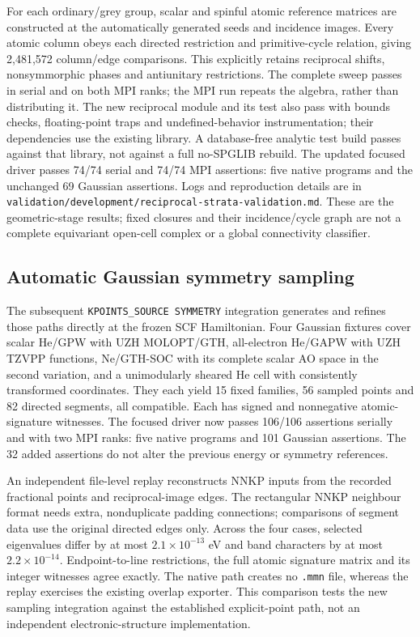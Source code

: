 \documentclass[11pt]{article}
\begin{document}
For each ordinary/grey group, scalar and spinful atomic reference
matrices are constructed at the automatically generated seeds and
incidence images. Every atomic column obeys each directed restriction
and primitive-cycle relation, giving 2,481,572 column/edge comparisons.
This explicitly retains reciprocal shifts, nonsymmorphic phases and
antiunitary restrictions. The complete sweep passes in serial and
on both MPI ranks; the MPI run repeats the algebra, rather than
distributing it. The new reciprocal module and its test also pass
with bounds checks, floating-point traps and undefined-behavior
instrumentation; their dependencies use the existing library. A
database-free analytic test build passes against that library, not
against a full no-SPGLIB rebuild. The updated focused driver passes
74/74 serial and 74/74 MPI assertions: five native programs and the
unchanged 69 Gaussian assertions. Logs and reproduction details are
in \texttt{validation/development/reciprocal-strata-validation.md}.
These are the geometric-stage results; fixed closures and their
incidence/cycle graph are not a complete equivariant open-cell complex
or a global connectivity classifier.

\subsection{Automatic Gaussian symmetry sampling}
The subsequent \texttt{KPOINTS\_SOURCE SYMMETRY} integration generates
and refines those paths directly at the frozen SCF Hamiltonian. Four
Gaussian fixtures cover scalar He/GPW with UZH MOLOPT/GTH, all-electron
He/GAPW with UZH TZVPP functions, Ne/GTH-SOC with its complete scalar
AO space in the second variation, and a unimodularly sheared He cell
with consistently transformed coordinates. They each yield 15 fixed
families, 56 sampled points and 82 directed segments, all compatible.
Each has signed and nonnegative atomic-signature witnesses. The focused
driver now passes 106/106 assertions serially and with two MPI ranks:
five native programs and 101 Gaussian assertions. The 32 added
assertions do not alter the previous energy or symmetry references.

An independent file-level replay reconstructs NNKP inputs from the
recorded fractional points and reciprocal-image edges. The rectangular
NNKP neighbour format needs extra, nonduplicate padding connections;
comparisons of segment data use the original directed edges only.
Across the four cases, selected eigenvalues differ by at most
$2.1\times10^{-13}$ eV and band characters by at most
$2.2\times10^{-14}$. Endpoint-to-line restrictions, the full atomic
signature matrix and its integer witnesses agree exactly. The native
path creates no \texttt{.mmn} file, whereas the replay exercises the
existing overlap exporter. This comparison tests the new sampling
integration against the established explicit-point path, not an
independent electronic-structure implementation.
\end{document}
